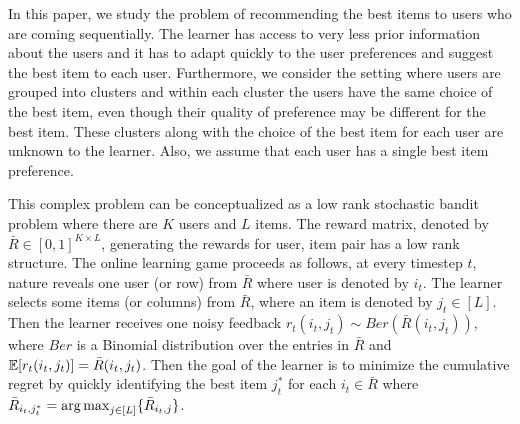 In this paper, we study the problem of recommending the best items to users who are coming sequentially. The learner has access to very less prior information about the users and it has to adapt quickly to the user preferences and suggest the best item to each user. Furthermore, we consider the setting where users are grouped into clusters and within each cluster the users have the same choice of the best item, even though their quality of preference may be different for the best item. These clusters along with the choice of the best item for each user are unknown to the learner.  Also, we assume that each user has a single best item preference.

	This complex problem can be conceptualized as a low rank stochastic bandit problem where there are $K$ users and $L$ items. The reward matrix, denoted by $\bar{R}\in [0,1]^{K\times L}$,  generating the rewards for user, item pair has a low rank structure. The online learning game proceeds as follows, at every timestep $t$,  nature reveals one user (or row) from $\bar{R}$ where user is denoted by $i_t$. The learner selects some items (or columns) from $\bar{R}$, where an item is denoted by $j_t\in [L]$. Then the learner receives one noisy feedback $r_{t}(i_t,j_t)\sim Ber(\bar{R}(i_t,j_t))$, where $Ber$ is a Binomial distribution over the entries in $\bar{R}$ and $\mathbb{E}[r_{t}(i_t,j_t)] = \bar{R}(i_t,j_t)$. Then the goal of the learner is to minimize the cumulative regret by quickly identifying the best item $j^*_t$ for each $i_t\in \bar{R}$ where $\bar{R}_{i_t,j^*_t} = \mathop{\rm arg\,max} _{j\in[L]}\lbrace \bar{R}_{i_t,j} \rbrace$. 
	
	
